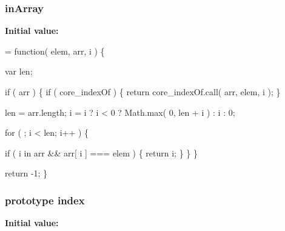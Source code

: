 \hypertarget{jquery-1_810_82-vsdoc_8js_a8203f20935038ea9f23057d6b9bd0c35}{
\subsubsection[{in\-Array}]{ in\-Array}}\label{jquery-1_810_82-vsdoc_8js_a8203f20935038ea9f23057d6b9bd0c35}
{\bfseries Initial value\-:}
\begin{DoxyCode}
= \textcolor{keyword}{function}( elem, arr, i ) \{


        var len;

        \textcolor{keywordflow}{if} ( arr ) \{
            \textcolor{keywordflow}{if} ( core\_indexOf ) \{
                \textcolor{keywordflow}{return} core\_indexOf.call( arr, elem, i );
            \}

            len = arr.length;
            i = i ? i < 0 ? Math.max( 0, len + i ) : i : 0;

            \textcolor{keywordflow}{for} ( ; i < len; i++ ) \{
                
                \textcolor{keywordflow}{if} ( i in arr && arr[ i ] === elem ) \{
                    \textcolor{keywordflow}{return} i;
                \}
            \}
        \}

        \textcolor{keywordflow}{return} -1;
    \}
\end{DoxyCode}
\hypertarget{jquery-1_810_82-vsdoc_8js_a75bb12d1f23302a9eea93a6d89d0193e}{
\subsubsection[{index}]{ {\bf prototype} index}}\label{jquery-1_810_82-vsdoc_8js_a75bb12d1f23302a9eea93a6d89d0193e}
{\bfseries Initial value\-:}
